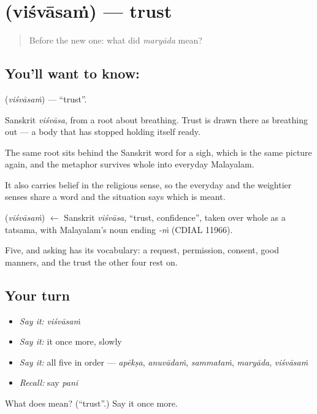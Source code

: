 \section[\texorpdfstring{\ml{വിശ്വാസം} (viśvāsaṁ)}{വിശ്വാസം (viśvāsaṁ)}]{ (viśvāsaṁ) — trust}

\label{lesson:ML-C65-trust}



\begin{quote}
Before the new one: what did \emph{maryāda} mean?
\end{quote}

\subsection*{You'll want to know: }
\textbf{} (\emph{viśvāsaṁ}) — \textquotedblleft{}trust\textquotedblright{}.

Sanskrit \emph{viśvāsa}, from a root about breathing. Trust is drawn there as breathing out — a body that has stopped holding itself ready.

The same root sits behind the Sanskrit word for a sigh, which is the same picture again, and the metaphor survives whole into everyday Malayalam.

It also carries belief in the religious sense, so the everyday and the weightier senses share a word and the situation says which is meant.

\begin{cousinweb}
\textbf{} (\emph{viśvāsaṁ}) $\leftarrow$ Sanskrit \emph{viśvāsa}, \textquotedblleft{}trust, confidence\textquotedblright{}, taken over whole as a tatsama, with Malayalam's noun ending \emph{-ṁ} (CDIAL 11966).
\end{cousinweb}

\begin{grammarlens}[title={What you've built}]
Five, and asking has its vocabulary: a request, permission, consent, good manners, and the trust the other four rest on.
\end{grammarlens}

\subsection*{Your turn}
\begin{itemize}
\raggedright
  \item \emph{Say it:} \emph{viśvāsaṁ}
  \item \emph{Say it:} it once more, slowly
  \item \emph{Say it:} all five in order — \emph{apēkṣa}, \emph{anuvādaṁ}, \emph{sammataṁ}, \emph{maryāda}, \emph{viśvāsaṁ}
  \item \emph{Recall:} say \emph{pani}
\end{itemize}

\begin{tcolorbox}[breakable,colback=teal!4,colframe=teal!35!black,title={Before you move on}]
What does  mean? (\textquotedblleft{}trust\textquotedblright{}.) Say it once more.
\end{tcolorbox}
